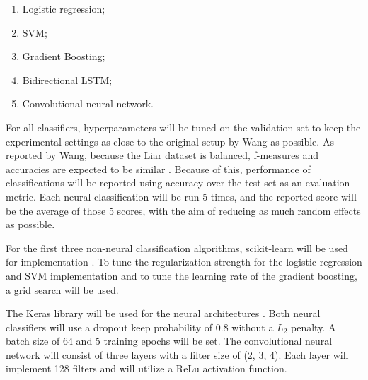\begin{enumerate}
    \item Logistic regression;
    \item SVM;
    \item Gradient Boosting;
    \item Bidirectional LSTM;
    \item Convolutional neural network.
\end{enumerate}

For all classifiers, hyperparameters will be tuned on the validation set to keep the experimental settings as close to the original setup by Wang as possible.
As reported by Wang, because the Liar dataset is balanced, f-measures and accuracies are expected to be similar \cite{wang2018}.
Because of this, performance of classifications will be reported using accuracy over the test set as an evaluation metric. 
Each neural classification will be run 5 times, and the reported score will be the average of those 5 scores, with the aim of reducing as much random effects as possible. 

For the first three non-neural classification algorithms, scikit-learn will be used for implementation \cite{scikit-learn}. 
To tune the regularization strength for the logistic regression and SVM implementation and to tune the learning rate of the gradient boosting, a grid search will be used. 

The Keras library will be used for the neural architectures \cite{keras}.
Both neural classifiers will use a dropout keep probability of 0.8 without a $L_{2}$ penalty.
A batch size of 64 and 5 training epochs will be set. 
The convolutional neural network will consist of three layers with a filter size of (2, 3, 4).
Each layer will implement 128 filters and will utilize a ReLu activation function.
